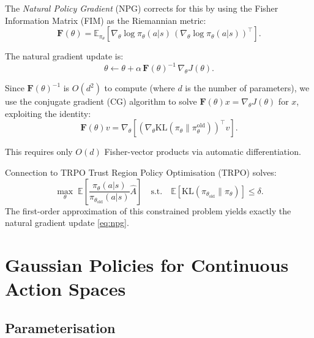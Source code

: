 \documentclass[11pt, a4paper]{article}
\newcommand{\E}{\mathbb{E}}
\newcommand{\T}{\top}
\newcommand{\grad}{\nabla}
\newcommand{\KL}{\mathrm{KL}}
\newcommand{\FIM}{\mathbf{F}}
\begin{document}
The \emph{Natural Policy Gradient} (NPG) \citep{kakade2001} corrects for this
by using the Fisher Information Matrix (FIM) as the Riemannian metric:
\begin{equation}
    \FIM(\theta) = \E_{\pi_\theta}\left[
        \grad_\theta \log \pi_\theta(a|s) \, (\grad_\theta \log \pi_\theta(a|s))^\T
    \right].
\end{equation}

The natural gradient update is:
\begin{equation}
    \theta \leftarrow \theta + \alpha \, \FIM(\theta)^{-1} \, \grad_\theta J(\theta).
    \label{eq:npg}
\end{equation}

Since $\FIM(\theta)^{-1}$ is $O(d^2)$ to compute (where $d$ is the number of
parameters), we use the conjugate gradient (CG) algorithm to solve
$\FIM(\theta) x = \grad_\theta J(\theta)$ for $x$, exploiting the identity:
\begin{equation}
    \FIM(\theta) v = \grad_\theta \left[ (\grad_\theta \KL(\pi_\theta \| \pi_\theta^{\mathrm{old}}))^\T v \right].
\end{equation}

This requires only $O(d)$ Fisher-vector products via automatic differentiation.

\begin{remark}{Connection to TRPO}{}
Trust Region Policy Optimisation (TRPO) \citep{schulman2015b} solves:
\begin{equation}
    \max_\theta \; \E\left[\frac{\pi_\theta(a|s)}{\pi_{\theta_{\mathrm{old}}}(a|s)} \hat{A}\right]
    \quad \text{s.t.} \quad \E[\KL(\pi_{\theta_{\mathrm{old}}} \| \pi_\theta)] \leq \delta.
\end{equation}
The first-order approximation of this constrained problem yields exactly the
natural gradient update \eqref{eq:npg}.
\end{remark}

\section{Gaussian Policies for Continuous Action Spaces}
\label{sec:gaussian}

\subsection{Parameterisation}
\end{document}
